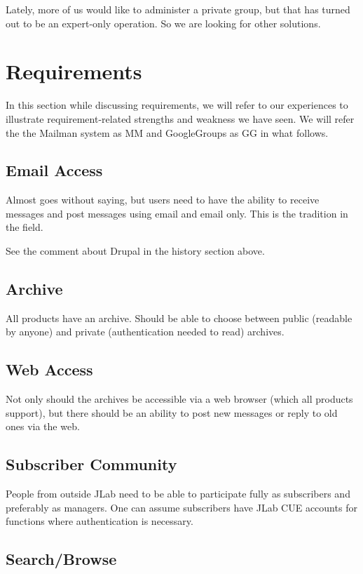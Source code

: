 \documentclass{article}
\begin{document}
Lately, more of us would like to administer a private group, but that
has turned out to be an expert-only operation. So we are looking for
other solutions.

\section{Requirements}

In this section while discussing requirements, we will refer to our
experiences to illustrate requirement-related strengths and weakness
we have seen. We will refer the the Mailman system as MM and
GoogleGroups as GG in what follows.

\subsection{Email Access}

Almost goes without saying, but users need to have the ability to receive messages and post messages using email and email only. This is the tradition in the field.

See the comment about Drupal in the history section above.

\subsection{Archive}

All products have an archive. Should be able to choose between public
(readable by anyone) and private (authentication needed to read)
archives.

\subsection{Web Access}

Not only should the archives be accessible via a web browser (which all products support), but there should be an ability to post new messages or reply to old ones via the web.

\subsection{Subscriber Community}

People from outside JLab need to be able to participate fully as subscribers and preferably as managers. One can assume subscribers have JLab CUE accounts for functions where authentication is necessary.

\subsection{Search/Browse}
\end{document}

